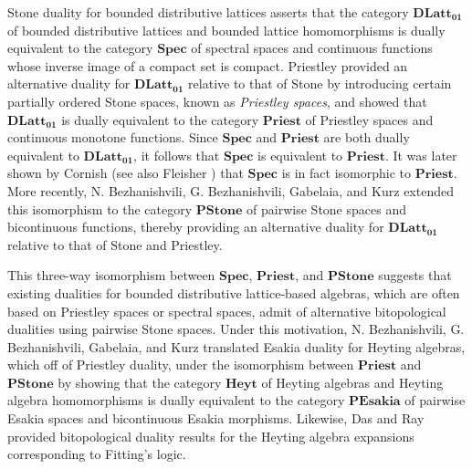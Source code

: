 \documentclass{amsart}
\theoremstyle{plain}
\theoremstyle{definition}
\begin{document}
Stone duality for bounded distributive lattices \cite{stone2} asserts that the category $\mathbf{DLatt_{01}}$ of bounded distributive lattices and bounded lattice homomorphisms is dually equivalent to the category $\mathbf{Spec}$ of spectral spaces and continuous functions whose inverse image of a compact set is compact. Priestley \cite{priestly} provided an alternative duality for $\mathbf{DLatt_{01}}$ relative to that of Stone by introducing certain partially ordered Stone spaces, known as \emph{Priestley spaces}, and showed that $\mathbf{DLatt_{01}}$ is dually equivalent to the category $\mathbf{Priest}$ of Priestley spaces and continuous monotone functions. Since $\mathbf{Spec}$ and $\mathbf{Priest}$ are both dually equivalent to $\mathbf{DLatt_{01}}$, it follows that $\mathbf{Spec}$ is equivalent to $\mathbf{Priest}$. It was later shown by Cornish \cite{cornish} (see also Fleisher \cite{fleisher}) that $\mathbf{Spec}$ is in fact isomorphic to $\mathbf{Priest}$. More recently, N. Bezhanishvili, G. Bezhanishvili, Gabelaia, and Kurz \cite{bezhanishvili} extended this isomorphism to the category $\mathbf{PStone}$ of pairwise Stone spaces and bicontinuous functions, thereby providing an alternative duality for $\mathbf{DLatt_{01}}$ relative to that of Stone and Priestley. 


This three-way isomorphism between $\mathbf{Spec}$, $\mathbf{Priest}$, and $\mathbf{PStone}$ suggests that existing dualities for bounded distributive lattice-based algebras, which are often based on Priestley spaces or spectral spaces, admit of alternative bitopological dualities using pairwise Stone spaces. Under this motivation, N. Bezhanishvili, G. Bezhanishvili, Gabelaia, and Kurz \cite{bezhanishvili} translated Esakia duality for Heyting algebras, which  off of Priestley duality, under the isomorphism between $\mathbf{Priest}$ and $\mathbf{PStone}$ by showing that the category $\mathbf{Heyt}$ of Heyting algebras and Heyting algebra homomorphisms is dually equivalent to the category $\mathbf{PEsakia}$ of pairwise Esakia spaces and bicontinuous Esakia morphisms. Likewise, Das and Ray \cite{das} provided bitopological duality results for the Heyting algebra expansions corresponding to Fitting's logic. 
\end{document}
